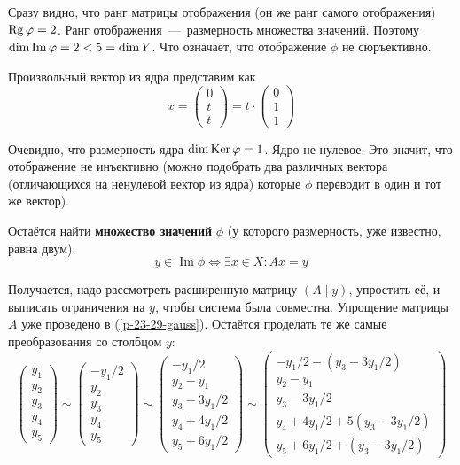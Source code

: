 \documentclass[a4paper,12pt]{article}
\DeclareMathOperator{\Imag}{Im}
\begin{document}
\begin{solution}
    Сразу видно, что ранг матрицы отображения (он же ранг самого отображения) $\Rg\phi \hm= 2$.
    Ранг отображения~---~размерность множества значений.
    Поэтому $\dim\Imag\phi \hm= 2 \hm< 5 \hm= \dim Y$.
    Что означает, что отображение $\phi$ не сюръективно.
    
    Произвольный вектор из ядра представим как
    \[
      x = \begin{pmatrix}
        0 \\ t \\ t
      \end{pmatrix} = t \cdot \begin{pmatrix}
        0 \\ 1 \\ 1
      \end{pmatrix}
    \]
    
    Очевидно, что размерность ядра $\dim\Ker\phi \hm= 1$.
    Ядро не нулевое.
    Это значит, что отображение не инъективно (можно подобрать два различных вектора (отличающихся на ненулевой вектор из ядра) которые $\phi$ переводит в один и тот же вектор).
    
    \medskip
    
    Остаётся найти \textbf{множество значений} $\phi$ (у которого размерность, уже известно, равна двум):
    \[
      y \in \Imag\phi \Leftrightarrow \exists x \in X: Ax = y
    \]
    
    Получается, надо рассмотреть расширенную матрицу $(A \mid y)$, упростить её, и выписать ограничения на $y$, чтобы система была совместна.
    Упрощение матрицы $A$ уже проведено в (\ref{p-23-29-gauss}).
    Остаётся проделать те же самые преобразования со столбцом $y$:
    \[
      \begin{pmatrix}
        y_1 \\ y_2 \\ y_3 \\ y_4 \\ y_5
      \end{pmatrix}
      \sim \begin{pmatrix}
        -y_1/2 \\ y_2 \\ y_3 \\ y_4 \\ y_5
      \end{pmatrix}
      \sim \begin{pmatrix}
        -y_1/2 \\ y_2 - y_1 \\ y_3 - 3y_1/2 \\ y_4 + 4y_1/2 \\ y_5 + 6y_1/2
      \end{pmatrix}
      \sim \begin{pmatrix}
        -y_1/2 - \left(y_3 - 3y_1/2\right) \\ y_2 - y_1 \\ y_3 - 3y_1/2 \\ y_4 + 4y_1/2 + 5 \left(y_3 - 3y_1/2\right) \\ y_5 + 6y_1/2 + \left(y_3 - 3y_1/2\right)
      \end{pmatrix}
    \]
    

\end{solution}
\end{document}
